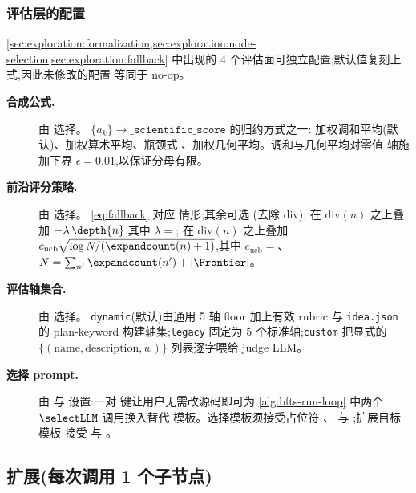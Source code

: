 \subsubsection*{评估层的配置}\label{sec:exploration:config-layers}

\cref{sec:exploration:formalization,sec:exploration:node-selection,sec:exploration:fallback}
中出现的 4 个评估面可独立配置;默认值复刻上式,因此未修改的配置
等同于 no-op。

\begin{description}
  \item[\textbf{合成公式.}]
        由  选择。
        $\{a_k\}\!\to\!\texttt{\_scientific\_score}$ 的归约方式之一:
        加权调和平均(默认)、加权算术平均、瓶颈式
        、加权几何平均。调和与几何平均对零值
        轴施加下界 $\epsilon=0.01$,以保证分母有限。
  \item[\textbf{前沿评分策略.}]
        由  选择。
        \cref{eq:fallback} 对应 
        情形;其余可选 (去除 $\mathrm{div}$);
         在 $\mathrm{div}(n)$ 之上叠加
        $-\lambda\,\depth{n}$,其中
        $\lambda=$;
         在 $\mathrm{div}(n)$ 之上叠加
        $c_{\mathrm{ucb}}\sqrt{\log N / (\expandcount(n)+1)}$,其中
        $c_{\mathrm{ucb}}=$、$N = \sum_{n'}\expandcount(n')+|\Frontier|$。
  \item[\textbf{评估轴集合.}]
        由  选择。
        \texttt{dynamic}(默认)由通用 5 轴 floor 加上有效 rubric
        与 \texttt{idea.json} 的 plan-keyword 构建轴集;\texttt{legacy}
        固定为 5 个标准轴;\texttt{custom} 把显式的
        $\{(\mathrm{name},\mathrm{description},w)\}$ 列表逐字喂给
        judge LLM。
  \item[\textbf{选择 prompt.}]
        由  与
         设置:一对
         键让用户无需改源码即可为
        \cref{alg:bfts-run-loop} 中两个 $\selectLLM$ 调用换入替代
        模板。选择模板须接受占位符 、
         与 ;扩展目标模板
        接受  与 。
\end{description}

\subsection{扩展(每次调用 1 个子节点)}\label{sec:exploration:expansion}

